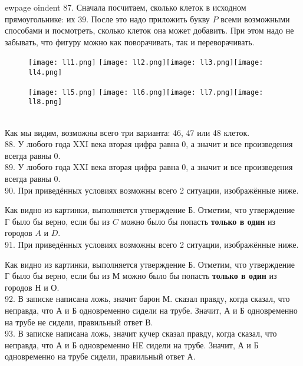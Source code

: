 ewpage
oindent
87. Сначала посчитаем, сколько клеток в исходном прямоугольнике: их 39. После это надо приложить букву $P$ всеми возможными способами и посмотреть, сколько клеток она может добавить. При этом надо не забывать, что фигуру можно как поворачивать, так и переворачивать.
\begin{figure}[ht!]
\texttt{[image: ll1.png]} \texttt{[image: ll2.png]}\texttt{[image: ll3.png]}\texttt{[image: ll4.png]}\end{figure}
\begin{figure}[ht!]\texttt{[image: ll5.png]} \texttt{[image: ll6.png]}\texttt{[image: ll7.png]}\texttt{[image: ll8.png]}
\end{figure}\\
Как мы видим, возможны всего три варианта: 46, 47 или 48 клеток.\\
88. У любого года XXI века вторая цифра равна 0, а значит и все произведения всегда равны 0.\\
89. У любого года XXI века вторая цифра равна 0, а значит и все произведения всегда равны 0.\\
90. При приведённых условиях возможны всего 2 ситуации, изображённые ниже.
\begin{center}
\begin{figure}[ht!]
\end{figure}
\end{center}
Как видно из картинки, выполняется утверждение Б. Отметим, что утверждение Г было бы верно, если бы из $C$ можно было бы попасть {\bf только в один} из городов $A$ и $D.$\\
91. При приведённых условиях возможны всего 2 ситуации, изображённые ниже.
\begin{center}
\begin{figure}[ht!]
\end{figure}
\end{center}
Как видно из картинки, выполняется утверждение Б. Отметим, что утверждение Г было бы верно, если бы из М можно было бы попасть {\bf только в один} из городов Н и О.\\
92. В записке написана ложь, значит барон М. сказал правду, когда сказал, что неправда, что А и Б одновременно сидели на трубе. Значит, А и Б одновременно на трубе не сидели, правильный ответ В.\\
93. В записке написана ложь, значит кучер сказал правду, когда сказал, что неправда, что А и Б одновременно НЕ сидели на трубе. Значит, А и Б одновременно на трубе сидели, правильный ответ А.\\
